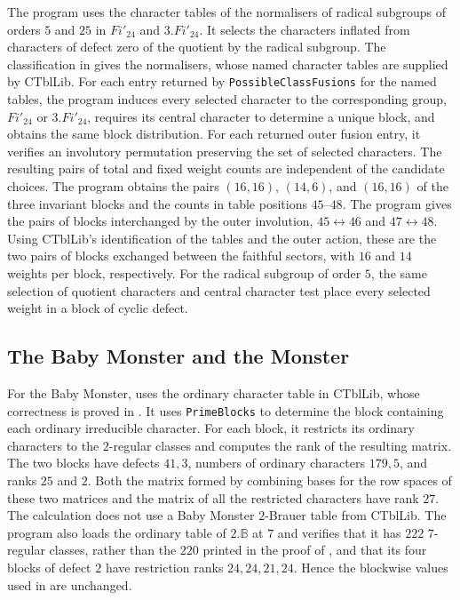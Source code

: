 \documentclass[10pt]{amsart}
\theoremstyle{definition}
\newcommand{\Baby}{\mathbb B}
\numberwithin{equation}{section}
\numberwithin{table}{section}
\begin{document}
The program  uses the character tables of the
normalisers of radical subgroups of orders $5$ and $25$ in $Fi'_{24}$
and $3.Fi'_{24}$.  It selects the characters inflated from characters of defect zero
of the quotient by the radical subgroup. The classification in
\cite[Proposition~4.1 and Table~1]{AnCannonOBrienUngerFi24} gives the
normalisers, whose named character tables are supplied by CTblLib.  For each entry returned by \texttt{PossibleClassFusions}
for the named tables, the program induces every selected character to
the corresponding group, $Fi'_{24}$ or $3.Fi'_{24}$, requires its central character to determine a unique block,
and obtains the same block distribution.  For each returned outer fusion entry, it verifies an involutory permutation
preserving the set of selected characters.  The resulting pairs of total and fixed weight counts are independent of the
candidate choices. The program obtains the pairs $(16,16)$, $(14,6)$, and
$(16,16)$ of the three invariant blocks and the counts in table positions
$45$--$48$.  The program  gives the pairs of blocks interchanged by the outer involution,
$45\leftrightarrow46$ and $47\leftrightarrow48$.  Using CTblLib's identification of the tables and the outer action,
these are the two pairs of blocks exchanged between the faithful sectors,
with $16$ and $14$ weights per block, respectively.
For the radical subgroup of order $5$, the same selection of quotient
characters and central character test place every selected weight in a
block of cyclic defect.

\subsection{The Baby Monster and the Monster}
\label{app:baby-monster}

For the Baby Monster,
 uses the ordinary character table in
CTblLib, whose correctness is proved in
\cite[Section~7]{BreuerMagaardWilsonBaby2020}.  It uses \texttt{PrimeBlocks} to determine the block containing each ordinary
irreducible character. For each block, it restricts its ordinary characters to
the $2$-regular classes and computes the rank of the resulting matrix.  The two blocks have defects
$41,3$, numbers of ordinary characters $179,5$, and ranks $25$ and $2$.
Both the matrix formed by combining bases for the row spaces of these two
matrices and the matrix of all the restricted characters have rank $27$.  The calculation does not use a Baby
Monster $2$-Brauer table from CTblLib.
The program  also loads the ordinary
table of $2.\Baby$ at $7$ and verifies that it has $222$ $7$-regular
classes, rather than the $220$ printed in the proof of
\cite[Lemma~5.2]{AnWilsonBaby}, and that its four blocks of defect $2$ have
restriction ranks $24,24,21,24$.  Hence the blockwise values used in
\cite[Theorem~5.3]{AnWilsonBaby} are unchanged.
\end{document}
